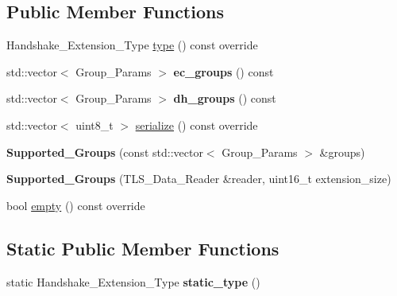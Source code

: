 \subsection*{Public Member Functions}
\begin{DoxyCompactItemize}
\item 
Handshake\+\_\+\+Extension\+\_\+\+Type \hyperlink{class_botan_1_1_t_l_s_1_1_supported___groups_ab3126c91ffe1b598019892ed08117a67}{type} () const override
\item 
\mbox{\label{class_botan_1_1_t_l_s_1_1_supported___groups_af5873fbe513ff065149a3bb12bbea2a0}} 
std\+::vector$<$ Group\+\_\+\+Params $>$ {\bfseries ec\+\_\+groups} () const
\item 
\mbox{\label{class_botan_1_1_t_l_s_1_1_supported___groups_a9dd037b2f181fd8ef857c4b9ecd1dd0b}} 
std\+::vector$<$ Group\+\_\+\+Params $>$ {\bfseries dh\+\_\+groups} () const
\item 
std\+::vector$<$ uint8\+\_\+t $>$ \hyperlink{class_botan_1_1_t_l_s_1_1_supported___groups_ad88fb72f307017125cca018982800d76}{serialize} () const override
\item 
\mbox{\label{class_botan_1_1_t_l_s_1_1_supported___groups_a14d8896db80eed02a4d315d5b2562c4d}} 
{\bfseries Supported\+\_\+\+Groups} (const std\+::vector$<$ Group\+\_\+\+Params $>$ \&groups)
\item 
\mbox{\label{class_botan_1_1_t_l_s_1_1_supported___groups_a7166ee349b67d19ceedf02f69cd56b75}} 
{\bfseries Supported\+\_\+\+Groups} (T\+L\+S\+\_\+\+Data\+\_\+\+Reader \&reader, uint16\+\_\+t extension\+\_\+size)
\item 
bool \hyperlink{class_botan_1_1_t_l_s_1_1_supported___groups_a00ea6c535e6d7198cf6b74c1fb4fe71a}{empty} () const override
\end{DoxyCompactItemize}
\subsection*{Static Public Member Functions}
\begin{DoxyCompactItemize}
\item 
\mbox{\label{class_botan_1_1_t_l_s_1_1_supported___groups_a84950f5dc55309ab663bee79c4eb5702}} 
static Handshake\+\_\+\+Extension\+\_\+\+Type {\bfseries static\+\_\+type} ()
\end{DoxyCompactItemize}


